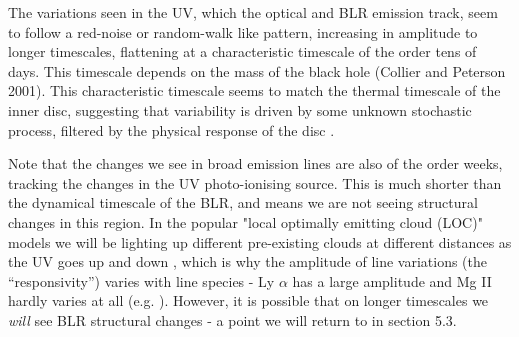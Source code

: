 \documentclass[11pt]{article}
\begin{document}
The variations seen in the UV, which the optical and BLR emission track, seem to follow a red-noise or random-walk like pattern, increasing in amplitude to longer timescales, flattening at a characteristic timescale of the order tens of days. This timescale depends on the mass of the black hole (Collier and Peterson 2001). This characteristic timescale seems to match the thermal timescale of the inner disc, suggesting that variability is driven by some unknown stochastic process, filtered by the physical response of the disc \citep{Kelly2009, Kelly2011}.

Note that the changes we see in broad emission lines are also of the order weeks, tracking the changes in the UV photo-ionising source. This is much shorter than the dynamical timescale of the BLR, and means we are not seeing structural changes in this region. In the popular "local optimally emitting cloud (LOC)" models we will be lighting up different pre-existing clouds at different distances as the UV goes up and down \citep{Peterson2006,Goad2014}, which is why the amplitude of line variations (the ``responsivity'') varies with line species - Ly $\alpha$ has a large amplitude and Mg II hardly varies at all (e.g. \citet{Cackett2015}). However, it is possible that on longer timescales we {\em will} see BLR structural changes - a point we will return to in section 5.3.

%
%
\end{document}

